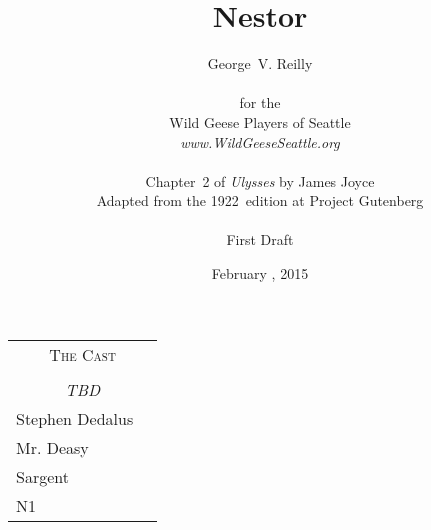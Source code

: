 



\title{\Huge Nestor}
\author{George~V. Reilly\\
\\
{\small for the}\\
Wild Geese Players of Seattle\\
{\emph{www.WildGeeseSeattle.org}}\\
\\
{\small Chapter~2 of \emph{Ulysses} by James Joyce}\\
{\small Adapted from the 1922~edition at Project Gutenberg}
\\
\\
{\small First Draft}}
\date{February , 2015}
\raggedbottom



\maketitle
\thispagestyle{empty}
\pagebreak

\begin{tabular}{lp{10cm}}
    \multicolumn{2}{c}{\Large \textsc{The Cast}} \\
\\
    \multicolumn{2}{c}{\large \textit{TBD}} \\
Stephen Dedalus \\
Mr. Deasy \\
Sargent \\
N1 \\
\end{tabular}

\thispagestyle{empty}
\newpage


\setcounter{page}{1}










